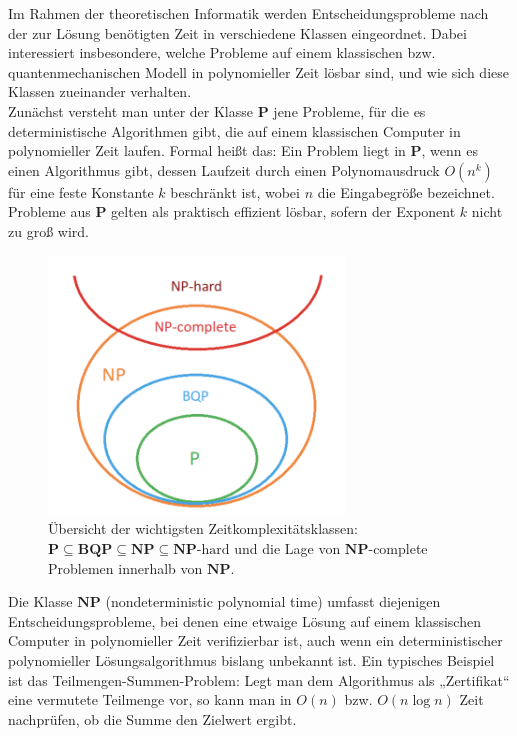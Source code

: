 Im Rahmen der theoretischen Informatik werden Entscheidungsprobleme nach der zur Lösung benötigten Zeit in verschiedene Klassen eingeordnet. Dabei interessiert insbesondere, welche Probleme auf einem klassischen bzw. quantenmechanischen Modell in polynomieller Zeit lösbar sind, und wie sich diese Klassen zueinander verhalten.\\

Zunächst versteht man unter der Klasse \(\mathbf{P}\) jene Probleme, für die es deterministische Algorithmen gibt, die auf einem klassischen Computer in polynomieller Zeit laufen. Formal heißt das: Ein Problem liegt in \(\mathbf{P}\), wenn es einen Algorithmus gibt, dessen Laufzeit durch einen Polynomausdruck \(O(n^k)\) für eine feste Konstante \(k\) beschränkt ist, wobei \(n\) die Eingabegröße bezeichnet. Probleme aus \(\mathbf{P}\) gelten als praktisch effizient lösbar, sofern der Exponent \(k\) nicht zu groß wird.

\begin{figure}[h!]
  \centering
  \includegraphics[width=0.7\textwidth]{images/basic-algorithms/problem-classes.png}
  \caption{Übersicht der wichtigsten Zeitkomplexitätsklassen: \(\mathbf{P}\subseteq \mathbf{BQP}\subseteq \mathbf{NP}\subseteq \mathbf{NP}\text{-hard}\) und die Lage von \(\mathbf{NP}\)-complete Problemen innerhalb von \(\mathbf{NP}\).}
  \label{fig:problem_classes}
\end{figure}

Die Klasse \(\mathbf{NP}\) (nondeterministic polynomial time) umfasst diejenigen Entscheidungsprobleme, bei denen eine etwaige Lösung auf einem klassischen Computer in polynomieller Zeit verifizierbar ist, auch wenn ein deterministischer polynomieller Lösungsalgorithmus bislang unbekannt ist. Ein typisches Beispiel ist das Teilmengen-Summen-Problem: Legt man dem Algorithmus als „Zertifikat“ eine vermutete Teilmenge vor, so kann man in \(O(n)\) bzw. \(O(n\log n)\) Zeit nachprüfen, ob die Summe den Zielwert ergibt.\\

